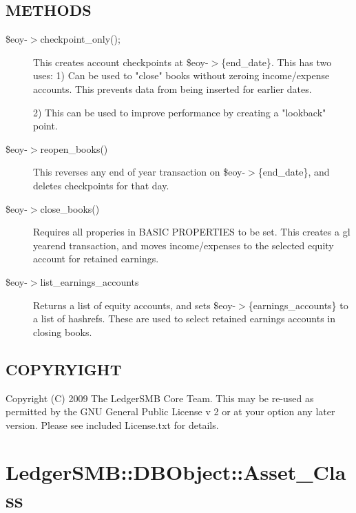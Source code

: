 \begin{description}
\begin{description}
\begin{description}
\begin{description}
\begin{description}
\begin{description}
\begin{description}
\begin{description}
\begin{description}
\begin{description}
\subsection*{METHODS\label{LedgerSMB::DBObject::EOY_METHODS}}
\begin{description}

\item[{\$eoy-$>$checkpoint\_only();}] \mbox{}

This creates account checkpoints at \$eoy-$>$\{end\_date\}.  This has two uses:
1)  Can be used to "close" books without zeroing income/expense accounts.  This
prevents data from being inserted for earlier dates.



2)  This can be used to improve performance by creating a "lookback" point.


\item[{\$eoy-$>$reopen\_books()}] \mbox{}

This reverses any end of year transaction on \$eoy-$>$\{end\_date\}, and deletes 
checkpoints for that day.


\item[{\$eoy-$>$close\_books()}] \mbox{}

Requires all properies in BASIC PROPERTIES to be set.  This creates a gl 
yearend transaction, and moves income/expenses to the selected equity account
for retained earnings.


\item[{\$eoy-$>$list\_earnings\_accounts}] \mbox{}

Returns a list of equity accounts, and sets \$eoy-$>$\{earnings\_accounts\} to a 
list of hashrefs.  These are used to select retained earnings accounts in 
closing books.

\end{description}
\subsection*{COPYRYIGHT\label{LedgerSMB::DBObject::EOY_COPYRYIGHT}}


Copyright (C) 2009 The LedgerSMB Core Team.  This may be re-used as permitted by
the GNU General Public License v 2 or at your option any later version.  Please
see included License.txt for details.

\section{LedgerSMB::DBObject::Asset\_Class\label{LedgerSMB::DBObject::Asset_Class}}



\end{description}
\end{description}
\end{description}
\end{description}
\end{description}
\end{description}
\end{description}
\end{description}
\end{description}
\end{description}

